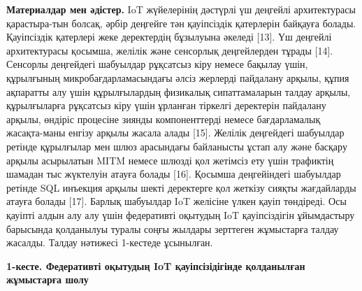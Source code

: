\begin{multicols}{2}
{\bfseries Материалдар мен әдістер.} IoT жүйелерінің дәстүрлі үш деңгейлі
архитектурасы қарастыра-тын болсақ, әрбір деңгейге тән қауіпсіздік
қатерлерін байқауға болады. Қауіпсіздік қатерлері жеке деректердің
бұзылуына әкеледі {[}13{]}. Үш деңгейлі архитектурасы қосымша, желілік
және сенсорлық деңгейлерден тұрады {[}14{]}. Сенсорлы деңгейдегі
шабуылдар рұқсатсыз кіру немесе бақылау үшін, құрылғының
микробағдарламасындағы әлсіз жерлерді пайдалану арқылы, құпия ақпаратты
алу үшін құрылғылардың физикалық сипаттамаларын талдау арқылы,
құрылғыларға рұқсатсыз кіру үшін ұрланған тіркелгі деректерін пайдалану
арқылы, өндіріс процесіне зиянды компоненттерді немесе бағдарламалық
жасақта-маны енгізу арқылы жасала алады {[}15{]}. Желілік деңгейдегі
шабуылдар ретінде құрылғылар мен шлюз арасындағы байланысты ұстап алу
және басқару арқылы асырылатын MITM немесе шлюзді қол жетімсіз ету үшін
трафиктің шамадан тыс жүктелуін атауға болады {[}16{]}. Қосымша
деңгейіндегі шабуылдар ретінде SQL инъекция арқылы шекті деректерге қол
жеткізу сияқты жағдайларды атауға болады {[}17{]}. Барлық шабуылдар IoT
желісіне үлкен қауіп төндіреді. Осы қауіпті алдын алу алу үшін
федеративті оқытудың IoT қауіпсіздігін ұйымдастыру барысында қолданылуы
туралы соңғы жылдары зерттеген жұмыстарға талдау жасалды. Талдау
нәтижесі 1-кестеде ұсынылған.
\end{multicols}

\newpage
{\bfseries 1-кесте. Федеративті оқытудың IoT қауіпсізідігінде қолданылған
жұмыстарға шолу}\vspace{0.5cm}

